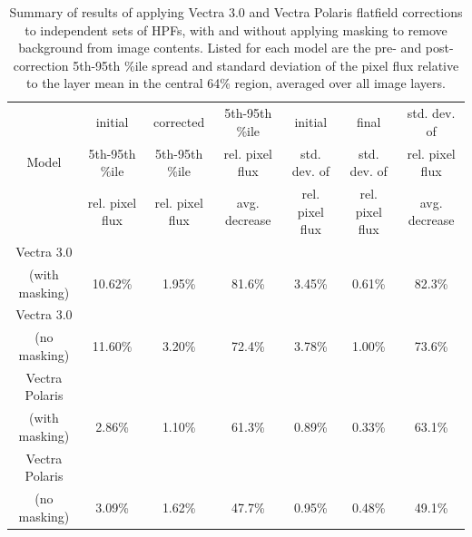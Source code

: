\documentclass[letterpaper,11pt]{article}
\begin{document}
\begin{table}[!htb]
\centering
\footnotesize
\begin{tabular}{c c c c c c c}
\hline \hline
               & initial         & corrected       & 5th-95th \%ile  & initial         & final           & std. dev. of    \\
Model          & 5th-95th \%ile  & 5th-95th \%ile  & rel. pixel flux & std. dev. of    & std. dev. of    & rel. pixel flux \\
               & rel. pixel flux & rel. pixel flux & avg. decrease   & rel. pixel flux & rel. pixel flux & avg. decrease   \\
\hline \hline
Vectra 3.0     &                 &                 &                 &                 &                 &                 \\
(with masking) & 10.62\%         & 1.95\%          & 81.6\%          & 3.45\%          & 0.61\%          & 82.3\%          \\[0.1cm]
\hline
Vectra 3.0     &                 &                 &                 &                 &                 &                 \\
(no masking)   & 11.60\%         & 3.20\%          & 72.4\%          & 3.78\%          & 1.00\%          & 73.6\%          \\[0.1cm]
\hline
Vectra Polaris &                 &                 &                 &                 &                 &                 \\
(with masking) & 2.86\%          & 1.10\%          & 61.3\%          & 0.89\%          & 0.33\%          & 63.1\%          \\[0.1cm]
\hline
Vectra Polaris &                 &                 &                 &                 &                 &                 \\
(no masking)   & 3.09\%          & 1.62\%          & 47.7\%          & 0.95\%          & 0.48\%          & 49.1\%          \\[0.1cm]
\hline \hline
\end{tabular}
\caption{\footnotesize Summary of results of applying Vectra 3.0 and Vectra Polaris flatfield corrections to independent sets of HPFs, with and without applying masking to remove background from image contents. Listed for each model are the pre- and post-correction 5th-95th \%ile spread and standard deviation of the pixel flux relative to the layer mean in the central 64\% region, averaged over all image layers.}
\label{tab:summary_applied_flatfield}
\end{table}
\end{document}
